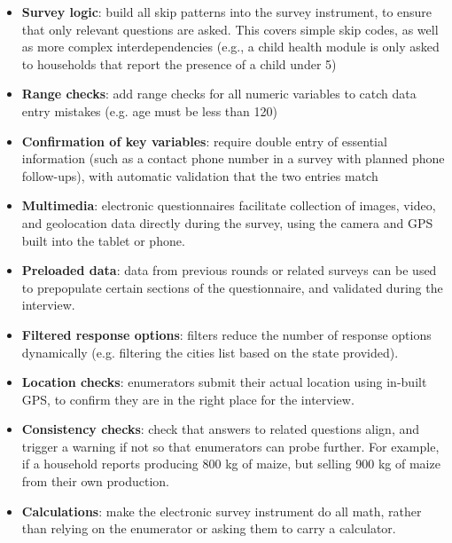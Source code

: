 {\begin{itemize}
	\item{\textbf{Survey logic}}: build all skip patterns into the survey instrument, to ensure that only relevant questions are asked. This covers simple skip codes, as well as more complex interdependencies (e.g., a child health module is only asked to households that report the presence of a child under 5)
	\item{\textbf{Range checks}}:  add range checks for all numeric variables to catch data entry mistakes (e.g. age must be less than 120)
	\item{\textbf{Confirmation of key variables}}: require double entry of essential information (such as a contact phone number in a survey with planned phone follow-ups), with automatic validation that the two entries match
	\item{\textbf{Multimedia}}: electronic questionnaires facilitate collection of images, video, and geolocation data directly during the survey, using the camera and GPS built into the tablet or phone.
	\item{\textbf{Preloaded data}}: data from previous rounds or related surveys can be used to prepopulate certain sections of the questionnaire, and validated during the interview. 
	\item{\textbf{Filtered response options}}: filters reduce the number of response options dynamically (e.g. filtering the cities list based on the state provided). 
	\item{\textbf{Location checks}}: enumerators submit their actual location using in-built GPS, to confirm they are in the right place for the interview. 
	\item{\textbf{Consistency checks}}: check that answers to related questions align, and trigger a warning if not so that enumerators can probe further. For example, if a household reports producing 800 kg of maize, but selling 900 kg of maize from their own production. 
	\item{\textbf{Calculations}}: make the electronic survey instrument do all math, rather than relying on the enumerator or asking them to carry a calculator. 
\end{itemize}

}
